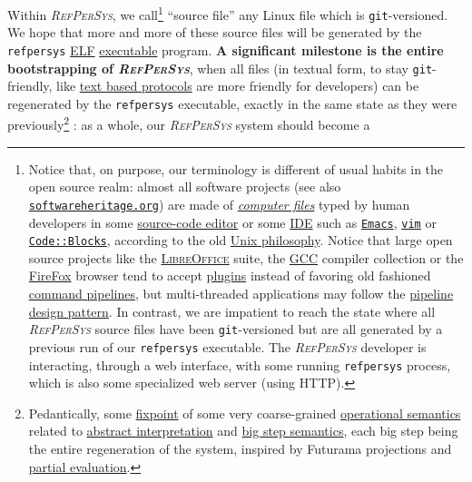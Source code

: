 \documentclass[11pt,a4paper,svgnames]{article}
\newcommand{\RefPerSys}{{\textit{\textsc{RefPerSys}}}}
\begin{document}
Within {\RefPerSys}, we call\footnote{Notice that, on purpose, our
terminology is different of usual habits in the open source realm:
almost all software projects (see also
\href{http://softwareheritage.org}{\texttt{softwareheritage.org}}) are
made of
\href{https://en.wikipedia.org/wiki/Computer\_file}{\textit{computer
    files}} typed by human developers in some
\href{https://en.wikipedia.org/wiki/Source-code\_editor}{source-code
  editor} or some
\href{https://en.wikipedia.org/wiki/Integrated\_development\_environment}{IDE}
such as \href{https://www.gnu.org/software/emacs/}{\texttt{Emacs}},
\href{http://vim.org/}{\texttt{vim}} or
\href{http://codeblocks.org/}{\texttt{Code::Blocks}}, according to the
old \href{https://en.wikipedia.org/wiki/Unix\_philosophy}{Unix
  philosophy}. Notice that large open source projects like the
\href{https://www.libreoffice.org/}{\textsc{LibreOffice}} suite, the
\href{http://gcc.gnu.org}{\textsc{GCC}} compiler collection or the
\href{https://www.mozilla.org/en-US/firefox/}{FireFox} browser tend to
accept
\href{https://en.wikipedia.org/wiki/Plug-in_(computing)}{plugins}
instead of favoring old fashioned
\href{https://en.wikipedia.org/wiki/Pipeline_(Unix)}{command
  pipelines}, but multi-threaded applications may follow the
\href{https://en.wikipedia.org/wiki/Pipeline_(software)}{pipeline
  design pattern}. In contrast, we are impatient to reach the state
where all {\RefPerSys} source files have been \texttt{git}-versioned
but are all generated by a previous run of our \texttt{refpersys}
executable. The {\RefPerSys} developer is interacting, through a web
interface, with some running \texttt{refpersys} process, which is also some
specialized web server (using  HTTP).}  ``source file'' any Linux file which is
\texttt{git}-versioned. We hope that more and more of these source
files will be generated by the \texttt{refpersys}
\href{https://en.wikipedia.org/wiki/Executable\_and\_Linkable_Format}{ELF}
\href{https://en.wikipedia.org/wiki/Executable}{executable}
program. \textbf{A significant milestone is the entire bootstrapping
  of \RefPerSys}, when all files (in textual form, to stay
\texttt{git}-friendly, like
\href{https://en.wikipedia.org/wiki/Text-based_protocol}{text based
  protocols} are more friendly for developers) can be regenerated by
the \texttt{refpersys} executable, exactly in the same state as they
were previously\footnote{Pedantically, some
\href{https://en.wikipedia.org/wiki/Fixed\_point\_(mathematics)}{fixpoint}
of some very coarse-grained
\href{https://en.wikipedia.org/wiki/Operational\_semantics}{operational
  semantics} related to
\href{https://en.wikipedia.org/wiki/Abstract\_interpretation}{abstract
  interpretation} and
\href{https://en.wikipedia.org/wiki/Operational\_semantics\#Structural\_operational\_semantics}{big
  step semantics}, each big step being the entire regeneration of the
system, inspired by Futurama projections and
\href{https://en.wikipedia.org/wiki/Partial\_evaluation}{partial
  evaluation}.} : as a whole, our {\RefPerSys} system should become a
\end{document}
